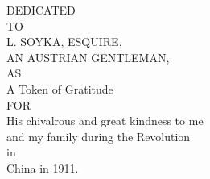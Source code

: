 \begin{dedication}
    DEDICATED \\
    \vspace{1cm}
    TO \\
    \vspace{1cm}
    L. SOYKA, ESQUIRE, \\
    \vspace{0.4cm}
    AN AUSTRIAN GENTLEMAN, \\
    \vspace{1cm}
    AS \\
    \vspace{1cm}
    A Token of Gratitude \\
    \vspace{1cm}
    FOR \\
    \vspace{1cm}
    His chivalrous and great kindness to me \\
    \vspace{0.4cm}
    and my family during the Revolution \\
    \vspace{1cm}
    in \\
    \vspace{1cm}
    China in 1911.
\end{dedication}
